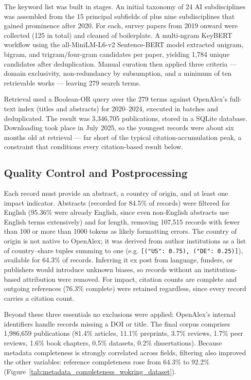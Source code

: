 \documentclass{article}
\let\cite\parencite
\begin{document}
	The keyword list was built in stages. An initial taxonomy of 24 AI subdisciplines was assembled from the 15 principal subfields of \citeauthor{gargiulo2022cartography} \cite{gargiulo2022cartography} plus nine subdisciplines that gained prominence after 2020. For each, survey papers from 2019 onward were collected (125 in total) and cleaned of boilerplate. A multi-ngram KeyBERT workflow using the all-MiniLM-L6-v2 Sentence-BERT model \cite{reimers2019sentencebert} extracted unigram, bigram, and trigram/four-gram candidates per paper, yielding 1,784 unique candidates after deduplication. Manual curation then applied three criteria --- domain exclusivity, non-redundancy by subsumption, and a minimum of ten retrievable works --- leaving 279 search terms.
	
	Retrieval used a Boolean-OR query over the 279 terms against OpenAlex's full-text index (titles and abstracts) for 2020--2024, executed in batches and deduplicated. The result was 3,346,705 publications, stored in a SQLite database. Downloading took place in July 2025, so the youngest records were about six months old at retrieval --- far short of the typical citation-accumulation peak, a constraint that conditions every citation-based result below.
	
	\subsection{Quality Control and Postprocessing}
	\label{quality_control_and_postprocessing}
	
	Each record must provide an abstract, a country of origin, and at least one impact indicator. Abstracts (recorded for 84.5\% of records) were filtered for English (95.36\% were already English, since even non-English abstracts use English terms extensively) and for length, removing 107,515 records with fewer than 100 or more than 1000 tokens as likely formatting errors. The country of origin is not native to OpenAlex; it was derived from author institutions as a list of country--share tuples summing to one (e.g. \texttt{[("US": 0.75), ("DE": 0.25)]}), available for 64.3\% of records. Inferring it ex post from language, funders, or publishers would introduce unknown biases, so records without an institution-based attribution were removed. For impact, citation counts are complete and outgoing references (76.3\% complete) were retained regardless, since every record carries a citation count.
	
	Beyond these three essentials no exclusions were applied; OpenAlex's internal identifiers handle records missing a DOI or title. The final corpus comprises 1,986,659 publications (81.4\% articles, 11.1\% preprints, 3.7\% reviews, 1.7\% peer reviews, 1.6\% book chapters, 0.5\% datasets, 0.2\% dissertations). Because metadata completeness is strongly correlated across fields, filtering also improved the other variables: reference completeness rose from 64.3\% to 92.2\% (Figure~\ref{tab:metadata_completeness_wokring_dataset}).
	
\end{document}

